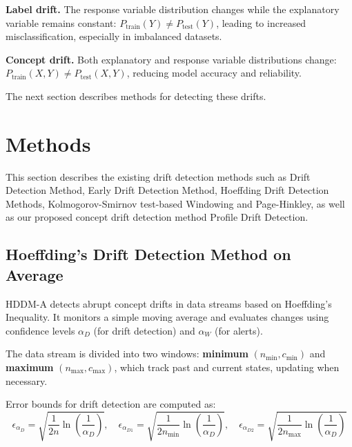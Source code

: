 \noindent \textbf{Label drift.} The response variable distribution changes while the explanatory variable remains constant: \(P_{\text{train}}(Y) \neq P_{\text{test}}(Y)\), leading to increased misclassification, especially in imbalanced datasets.

\noindent \textbf{Concept drift.} Both explanatory and response variable distributions change: \(P_{\text{train}}(X, Y) \neq P_{\text{test}}(X, Y)\), reducing model accuracy and reliability.

\noindent The next section describes methods for detecting these drifts.

\hypertarget{methods}{%
\section{Methods}\label{methods}}

This section describes the existing drift detection methods such as Drift Detection Method, Early Drift Detection Method, Hoeffding Drift Detection Methods, Kolmogorov-Smirnov test-based Windowing and Page-Hinkley, as well as our proposed concept drift detection method Profile Drift Detection.

\hypertarget{hoeffdings-drift-detection-method-on-average}{%
\subsection{Hoeffding's Drift Detection Method on Average}\label{hoeffdings-drift-detection-method-on-average}}

HDDM-A detects abrupt concept drifts in data streams based on Hoeffding's Inequality. It monitors a simple moving average and evaluates changes using confidence levels \(\alpha_D\) (for drift detection) and \(\alpha_W\) (for alerts).

The data stream is divided into two windows: \textbf{minimum} \((n_{\text{min}}, c_{\text{min}})\) and \textbf{maximum} \((n_{\text{max}}, c_{\text{max}})\), which track past and current states, updating when necessary.

Error bounds for drift detection are computed as:
\begin{equation}
\epsilon_{\alpha_D} = \sqrt{\frac{1}{2n} \ln \left(\frac{1}{\alpha_D}\right)}, \quad
\epsilon_{\alpha_{D1}} = \sqrt{\frac{1}{2n_{\text{min}}} \ln \left(\frac{1}{\alpha_D}\right)}, \quad
\epsilon_{\alpha_{D2}} = \sqrt{\frac{1}{2n_{\text{max}}} \ln \left(\frac{1}{\alpha_D}\right)}
\end{equation}

